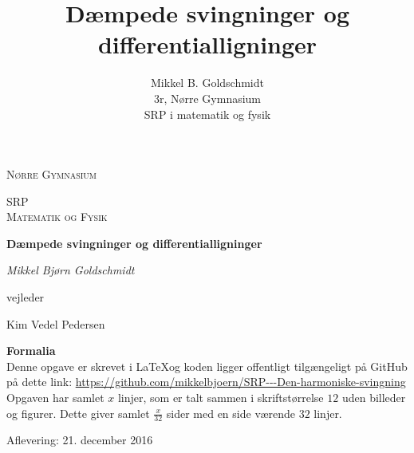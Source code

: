 \documentclass[11pt,a4paper,openany,oneside]{book}
\author{Mikkel B. Goldschmidt \\ 3r, Nørre Gymnasium \\ SRP i matematik og fysik}
\title{Dæmpede svingninger og differentialligninger}
\begin{document}


\begin{titlepage}
	\centering
	
	{\scshape\LARGE Nørre Gymnasium\par}
	\vspace{1cm}
	{\scshape\Large SRP \\ \large Matematik og Fysik\par}
	\vspace{1.5cm}
	{\huge\bfseries Dæmpede svingninger og differentialligninger\par}
	\vspace{2cm}
	{\Large\itshape Mikkel Bjørn Goldschmidt\par }
	
	
	\vfill
	vejleder\par
	Kim Vedel Pedersen
	\vfill

	\begin{framed}
	\textbf{Formalia}\\
	Denne opgave er skrevet i \LaTeX  og koden ligger offentligt tilgængeligt på GitHub på dette link: \url{https://github.com/mikkelbjoern/SRP---Den-harmoniske-svingning}\\
	
	Opgaven har samlet $x$ linjer, som er talt sammen i skriftstørrelse $12$ uden billeder og figurer. 
	Dette giver samlet $\frac{x}{32}$ sider med en side værende $32$ linjer.
	\end{framed}

	\vfill
	{\large Aflevering: 21. december 2016\par}
\end{titlepage}


\begin{singlespacing}
\tableofcontents
\end{singlespacing}
\pagebreak


























\end{document}
